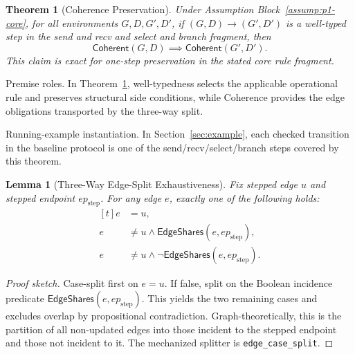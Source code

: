 \documentclass[a4paper,10pt,twocolumn,english]{article}
\numberwithin{equation}{section}
\theoremstyle{paperdef}
\theoremstyle{paperplain}
\newtheorem{theorem}[definition]{Theorem}
\newtheorem{lemma}[definition]{Lemma}
\theoremstyle{paperdef}
\theoremstyle{paperremark}
\newcommand{\Coherent}{\ensuremath{\mathsf{Coherent}}}
\newcommand{\EdgeShares}{\ensuremath{\mathsf{EdgeShares}}}
\begin{document}
\begin{theorem}[Coherence Preservation]
	\label{thm:coherence-preservation}
	Under Assumption Block~\ref{assump:p1-core}, for all environments $G,D,G',D'$, if $(G,D) \to (G',D')$ is a well-typed step in the send and recv and select and branch fragment, then
	\begin{equation}
		\Coherent(G,D) \implies \Coherent(G',D').
	\end{equation}
	This claim is exact for one-step preservation in the stated core rule fragment.
\end{theorem}

Premise roles. In Theorem~\ref{thm:coherence-preservation}, well-typedness
selects the applicable operational rule and preserves structural side
conditions, while Coherence provides the edge obligations transported by the
three-way split.

Running-example instantiation. In Section~\ref{sec:example}, each checked
transition in the baseline protocol is one of the send/recv/select/branch
steps covered by this theorem.

\begin{lemma}[Three-Way Edge-Split Exhaustiveness]
	\label{lem:p1-edge-split-exhaustive}
	Fix stepped edge $u$ and stepped endpoint $ep_{\mathrm{step}}$. For any edge $e$,
	exactly one of the following holds:
	\[
		\begin{aligned}[t]
			e & =u,                                                \\
			e & \neq u\land \EdgeShares(e,ep_{\mathrm{step}}),     \\
			e & \neq u\land \neg\EdgeShares(e,ep_{\mathrm{step}}).
		\end{aligned}
	\]
\end{lemma}

\begin{proof}[Proof sketch]
	Case-split first on $e=u$. If false, split on the Boolean incidence predicate
	$\EdgeShares(e,ep_{\mathrm{step}})$. This yields the two remaining cases and
	excludes overlap by propositional contradiction. Graph-theoretically, this is
	the partition of all non-updated edges into those incident to the stepped
	endpoint and those not incident to it. The mechanized splitter is
	\nolinkurl{edge_case_split}.
\end{proof}
\end{document}
